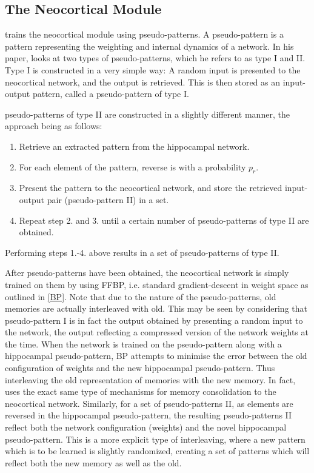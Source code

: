 \subsection{The Neocortical Module}

\cite{Hattori2010} trains the neocortical module using pseudo-patterns. A pseudo-pattern is a pattern representing the weighting and internal dynamics of a network. In his paper, \cite{Hattori2010} looks at two types of pseudo-patterns, which he refers to as type I and II. Type I is constructed in a very simple way: A random input is presented to the neocortical network, and the output is retrieved. This is then stored as an input-output pattern, called a pseudo-pattern of type I.

pseudo-patterns of type II are constructed in a slightly different manner, the approach being as follows:

\begin{enumerate}
\item Retrieve an extracted pattern from the hippocampal network.
\item For each element of the pattern, reverse is with a probability $p_r$.
\item Present the pattern to the neocortical network, and store the retrieved input-output pair (pseudo-pattern II) in a set.
\item Repeat step 2. and 3. until a certain number of pseudo-patterns of type II are obtained.
\end{enumerate}
Performing steps 1.-4. above results in a set of pseudo-patterns of type II.

After pseudo-patterns have been obtained, the neocortical network is simply trained on them by using FFBP, i.e. standard gradient-descent in weight space as outlined in \ref{BP}. Note that due to the nature of the pseudo-patterns, old memories are actually interleaved with old. This may be seen by considering that pseudo-pattern I is in fact the output obtained by presenting a random input to the network, the output reflecting a compressed version of the network weights at the time. When the network is trained on the pseudo-pattern along with a hippocampal pseudo-pattern, BP attempts to minimise the error between the old configuration of weights and the new hippocampal pseudo-pattern. Thus interleaving the old representation of memories with the new memory. In fact, \cite{Hattori2014} uses the exact same type of mechanisms for memory consolidation to the neocortical network.
Similarly, for a set of pseudo-patterns II, as elements are reversed in the hippocampal pseudo-pattern, the resulting pseudo-patterns II reflect both the network configuration (weights) and the novel hippocampal pseudo-pattern. This is a more explicit type of interleaving, where a new pattern which is to be learned is slightly randomized, creating a set of patterns which will reflect both the new memory as well as the old.

